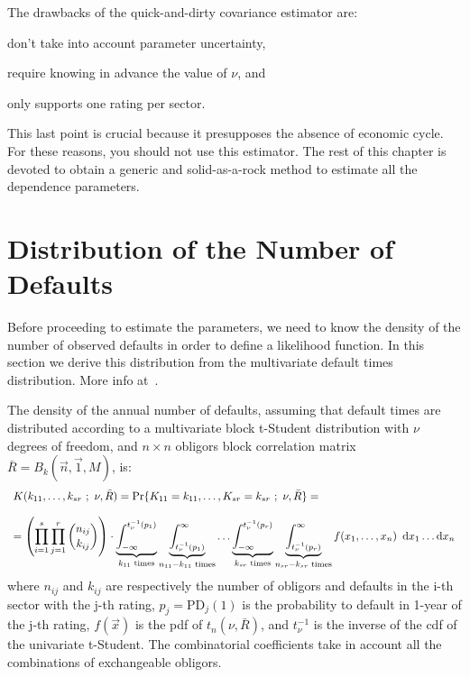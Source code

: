 \documentclass[11pt,fleqn]{book} %
\begin{document}
The drawbacks of the quick-and-dirty covariance estimator are:
\begin{inparaenum}[1)]
	\item don't take into account parameter uncertainty, 
	\item require knowing in advance the value of $\nu$, and
	\item only supports one rating per sector.
\end{inparaenum}
This last point is crucial because it presupposes the absence of economic 
cycle. For these reasons, you should not use this estimator. The rest of 
this chapter is devoted to obtain a generic and solid-as-a-rock method to 
estimate all the dependence parameters.

\section{Distribution of the Number of Defaults}

Before proceeding to estimate the parameters, we need to know the density
of the number of observed defaults in order to define a likelihood 
function. In this section we derive this distribution from the multivariate
default times distribution. More info at~\cite{gordy:2002,roncalli:2004}.

\begin{proposition}
	The density of the annual number of defaults, assuming that default 
	times are distributed according to a multivariate block t-Student distribution
	with $\nu$ degrees of freedom, and $n {\times} n$ obligors block correlation 
	matrix $\bar{R} = B_k(\vec{n},\vec{1},M)$, is:
	\begin{displaymath}
		\begin{array}{l}
			K(k_{11},\dots,k_{sr}\ ;\ \nu, \bar{R}) = 
			\Pr\{K_{11}=k_{11},\dots,K_{sr}=k_{sr}\ ;\ \nu, \bar{R}\} = \\
			\\
			= \left( \displaystyle \prod_{i=1}^s \prod_{j=1}^r \binom{n_{ij}}{k_{ij}} \right) \cdot
			\displaystyle
			\underbrace{\int_{-\infty}^{t_{\nu}^{-1}(p_1)}}_{k_{11} \text{ times}}
			\underbrace{\int_{t_{\nu}^{-1}(p_1)}^{\infty}}_{n_{11}-k_{11} \text{ times}}
			\dots
			\underbrace{\int_{-\infty}^{t_{\nu}^{-1}(p_r)}}_{k_{sr} \text{ times}}
			\underbrace{\int_{t_{\nu}^{-1}(p_r)}^{\infty}}_{n_{sr}-k_{sr} \text{ times}}
			f(x_1,\dots,x_n)\ \mathop{\mathrm{{}d}}\mathopen{} x_1 \dots \mathop{\mathrm{{}d}}\mathopen{} x_n
		\end{array}
	\end{displaymath}
	where $n_{ij}$ and $k_{ij}$ are respectively the number of obligors and 
	defaults in the i-th sector with the j-th rating, $p_j = \text{PD}_j(1)$ 
	is the probability to default in 1-year of the j-th rating, $f(\vec{x})$ 
	is the pdf of $t_n(\nu,\bar{R})$, and $t_{\nu}^{-1}$ is the inverse of the 
	cdf of the univariate t-Student. The combinatorial coefficients take in 
	account all the combinations of exchangeable obligors.
\end{proposition}
\end{document}
